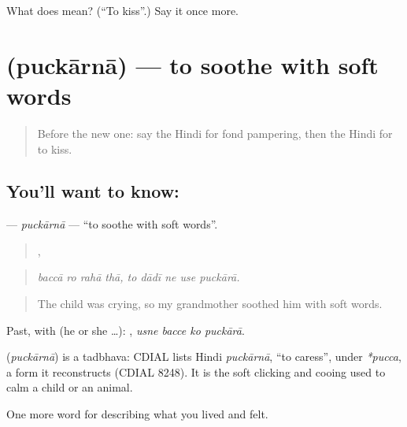 \begin{tcolorbox}[breakable,colback=teal!4,colframe=teal!35!black,title={Before you move on}]
What does  mean? (\textquotedblleft{}To kiss\textquotedblright{}.) Say it once more.
\end{tcolorbox}
\section[\texorpdfstring{\hi{पुचकारना} (puckārnā)}{पुचकारना (puckārnā)}]{ (puckārnā) — to soothe with soft words}

\label{lesson:HI-C459-puckarna}



\begin{quote}
Before the new one: say the Hindi for fond pampering, then the Hindi for to kiss.
\end{quote}

\subsection*{You'll want to know: }
\textbf{} — \emph{puckārnā} — \textquotedblleft{}to soothe with soft words\textquotedblright{}.

\begin{quote}
   ,     
\end{quote}

\begin{quote}
\emph{baccā ro rahā thā, to dādī ne use puckārā.}
\end{quote}

\begin{quote}
The child was crying, so my grandmother soothed him with soft words.
\end{quote}

Past, with  (he or she …):    , \emph{usne bacce ko puckārā}.

\begin{cousinweb}
\textbf{} (\emph{puckārnā}) is a tadbhava: CDIAL lists Hindi \emph{puckārnā}, \textquotedblleft{}to caress\textquotedblright{}, under \emph{*pucca}, a form it reconstructs (CDIAL 8248). It is the soft clicking and cooing used to calm a child or an animal.
\end{cousinweb}

\begin{grammarlens}[title={What you've built}]
One more word for describing what you lived and felt.
\end{grammarlens}

